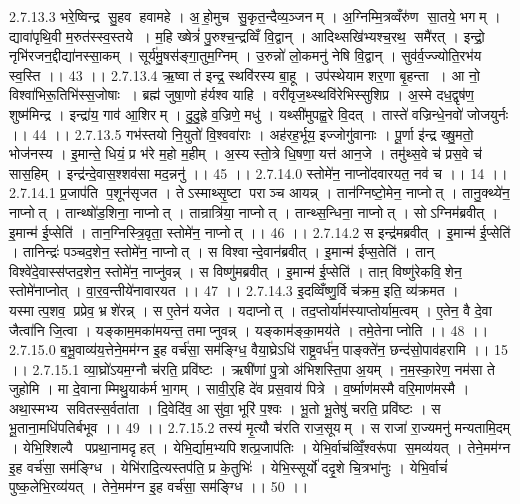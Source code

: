 2.7.13.3
भरे॒ष्विन्द्र॑ सु॒हव॑ हवामहे । अ॒॒हो॒मुच॑ सु॒कृत॒न्दैव्य॒ञ्जनम् । अ॒ग्निम्मि॒त्रव्वँरु॑ण सा॒तये॒ भगम् । द्यावा॑पृथि॒वी म॒रुत॑स्स्व॒स्तये । म॒हि ख्षेत्रं॑ पु॒रुश्च॒न्द्रव्विँ वि॒द्वान् । आदिथ्सखि॑भ्यश्च॒रथ॒॒ समै॑रत् । इन्द्रो॒ नृभि॑रजन॒द्दीद्या॑नस्सा॒कम् । सूर्य॑मु॒षस॑ङ्गा॒तुम॒ग्निम् । उ॒रुन्नो॑ लो॒कमनु॑ नेषि वि॒द्वान् । सुव॑र्व॒ज्ज्योति॒रभ॑य स्व॒स्ति ।। 43 ।।
2.7.13.4
ऋ॒ष्वा त॑ इन्द्र॒ स्थवि॑रस्य बा॒हू । उप॑स्थेयाम शर॒णा बृ॒हन्ता । आ नो॒ विश्वा॑भिरू॒तिभि॑स्स॒जोषाः । ब्रह्म॑ जुषा॒णो ह॑र्यश्व याहि । वरी॑वृज॒थ्स्थवि॑रेभिस्सुशिप्र । अ॒स्मे दध॒द्वृष॑ण॒॒ शुष्म॑मिन्द्र । इन्द्रा॑य॒ गाव॑ आ॒शिरम् । दु॒दु॒ह्रे व॒ज्रिणे॒ मधु॑ । यथ्सी॑मुपह्व॒रे वि॒दत् । तास्ते॑ वज्रिन्धे॒नवो॑ जोजयुर्नः ।। 44 ।।
2.7.13.5
गभ॑स्तयो नि॒युतो॑ वि॒श्ववा॑राः । अह॑रह॒र्भूय॒ इज्जोगु॑वानाः । पू॒र्णा इ॑न्द्र ख्षु॒मतो॒ भोज॑नस्य । इ॒मान्ते॒ धियं॒ प्र भ॑रे म॒हो म॒हीम् । अ॒स्य स्तो॒त्रे धि॒षणा॒ यत्त॑ आन॒जे । तमु॑थ्स॒वे च॑ प्रस॒वे च॑ सास॒हिम् । इन्द्र॑न्दे॒वास॒श्शव॑सा मद॒न्ननु॑ ।। 45 ।।
2.7.14.0
स्तोमे॑न॒ नाप्नो॑दवारयत॒ नव॑ च ।। 14 ।।
2.7.14.1
प्र॒जाप॑ति प॒शून॑सृजत । तेऽस्माथ्सृ॒ष्टा पराञ्च आयन्न् । तान॑ग्निष्टो॒मेन॒ नाप्नोत् । तानु॒क्थ्ये॑न॒ नाप्नोत् । तान्थ्षो॑ड॒शिना॒ नाप्नोत् । तान्रात्रि॑या॒ नाप्नोत् । तान्थ्स॒न्धिना॒ नाप्नोत् । सोऽग्निम॑ब्रवीत् । इ॒मान्म॑ ई॒प्सेति॑ । तान॒ग्निस्त्रि॒वृता॒ स्तोमे॑न॒ नाप्नोत् ।। 46 ।।
2.7.14.2
स इन्द्र॑मब्रवीत् । इ॒मान्म॑ ई॒प्सेति॑ । तानिन्द्रः॑ पञ्चद॒शेन॒ स्तोमे॑न॒ नाप्नोत् । स विश्वान्दे॒वान॑ब्रवीत् । इ॒मान्म॑ ईप्स॒तेति॑ । तान् विश्वे॑दे॒वास्स॑प्तद॒शेन॒ स्तोमे॑न॒ नाप्नु॑वन्न् । स विष्णु॑मब्रवीत् । इ॒मान्म॑ ई॒प्सेति॑ । ताऩ् विष्णु॑रेकवि॒॒शेन॒ स्तोमे॑नाप्नोत् । वा॒र॒व॒न्तीये॑नावारयत ।। 47 ।।
2.7.14.3
इ॒दव्विँष्णु॒र्वि च॑क्रम॒ इति॒ व्य॑क्रमत । यस्मात्प॒शव॒ प्रप्रेव॒ भ्रशे॑रन्न् । स ए॒तेन॑ यजेत । यदाप्नोत् । तद॒प्तोर्याम॑स्याप्तोर्याम॒त्वम् । ए॒तेन॒ वै दे॒वा जैत्वा॑नि जि॒त्वा । यङ्काम॒मका॑मयन्त॒ तमाप्नुवन्न् । यङ्काम॑ङ्का॒मय॑ते । तमे॒तेनाप्नोति ।। 48 ।।
2.7.15.0
ब॒भू॒वाव्य॑य॒त्तेने॒मम॑ग्न इ॒ह वर्च॑सा॒ सम॑ङ्ग्धि॒ वैया॒घ्रेऽधि॑ राष्ट्र॒वर्ध॑न॒पाङ्क्ते॑न॒ छन्द॑सो॒पाव॑हरामि ।। 15 ।।
2.7.15.1
व्या॒घ्रो॑ऽयम॒ग्नौ च॑रति॒ प्रवि॑ष्टः । ऋषी॑णां पु॒त्रो अ॑भिशस्ति॒पा अ॒यम् । न॒म॒स्का॒रेण॒ नम॑सा ते जुहोमि । मा दे॒वानाम्मिथु॒याक॑र्म भा॒गम् । सावी॒र्॒हि दे॑व प्रस॒वाय॑ पित्रे । व॒र्ष्माण॑मस्मै वरि॒माण॑मस्मै । अथा॒स्मभ्य॑ सवितस्स॒र्वता॑ता । दि॒वेदि॑व॒ आ सु॑वा॒ भूरि॑ प॒श्वः । भू॒तो भू॒तेषु॑ चरति॒ प्रवि॑ष्टः । स भू॒ताना॒मधि॑पतिर्बभूव ।। 49 ।।
2.7.15.2
तस्य॑ मृ॒त्यौ च॑रति राज॒सूयम् । स राजा॑ रा॒ज्यमनु॑ मन्यतामि॒दम् । येभि॒श्शिल्पै पप्रथा॒नामदृ॑हत् । येभि॒र्द्याम॒भ्यपि॑शत्प्र॒जाप॑तिः । येभि॒र्वाच॑व्विँ॒श्वरू॑पा स॒मव्य॑यत् । तेने॒मम॑ग्न इ॒ह वर्च॑सा॒ सम॑ङ्ग्धि । येभि॑रादि॒त्यस्तप॑ति॒ प्र के॒तुभिः॑ । येभि॒स्सूर्यो॑ ददृ॒शे चि॒त्रभा॑नुः । येभि॒र्वाचं॑ पुष्क॒लेभि॒रव्य॑यत् । तेने॒मम॑ग्न इ॒ह वर्च॑सा॒ सम॑ङ्ग्धि ।। 50 ।।
